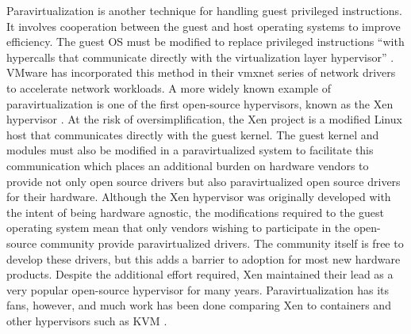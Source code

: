 Paravirtualization is another technique for handling guest privileged instructions.
It involves cooperation between the guest and host operating systems to improve efficiency.
The guest OS must be modified to replace privileged instructions ``with hypercalls that communicate directly with the virtualization layer hypervisor'' \autocite{vmwareVT}.
VMware has incorporated this method in their vmxnet series of network drivers to accelerate network workloads.
A more widely known example of paravirtualization is one of the first open-source hypervisors, known as the Xen hypervisor \autocite{_barham_1}.
At the risk of oversimplification, the Xen project is a modified Linux host that communicates directly with the guest kernel.
The guest kernel and modules must also be modified in a paravirtualized system to facilitate this communication which places an additional burden on hardware vendors to provide not only open source drivers but also paravirtualized open source drivers for their hardware.
Although the Xen hypervisor was originally developed with the intent of being hardware agnostic, the modifications required to the guest operating system mean that only vendors wishing to participate in the open-source community provide paravirtualized drivers.
The community itself is free to develop these drivers, but this adds a barrier to adoption for most new hardware products.
Despite the additional effort required, Xen maintained their lead as a very popular open-source hypervisor for many years.
Paravirtualization has its fans, however, and much work has been done comparing Xen to containers and other hypervisors such as KVM \autocite{_felter_1, _younge_1, wangAmazon2010, _che_1, _scheepers_1, wangAllocation2007, rathore2013kvm}.

